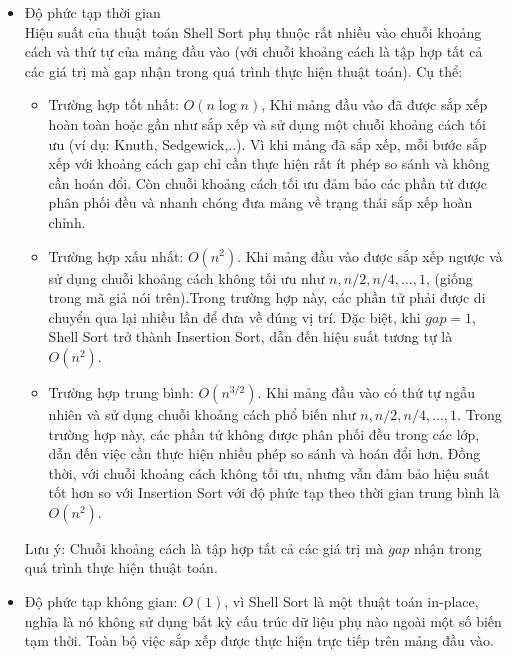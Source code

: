 \begin{itemize}
    \item Độ phức tạp thời gian\\
    Hiệu suất của thuật toán Shell Sort phụ thuộc rất nhiều vào chuỗi 
    khoảng cách và thứ tự của mảng đầu vào (với chuỗi khoảng cách là tập 
    hợp tất cả các giá trị mà gap nhận trong quá trình thực hiện thuật 
    toán). Cụ thể:
    \begin{itemize}[label=$\circ$]
	\item Trường hợp tốt nhất: $O\left(n\log{n}\right)$, Khi mảng đầu vào 
    đã được sắp xếp hoàn toàn hoặc gần như sắp xếp và sử dụng một chuỗi 
    khoảng cách tối ưu (ví dụ: Knuth, Sedgewick,..). Vì khi mảng đã sắp 
    xếp, mỗi bước sắp xếp với khoảng cách gap chỉ cần thực hiện rất ít 
    phép so sánh và không cần hoán đổi. Còn chuỗi khoảng cách tối ưu đảm 
    bảo các phần tử được phân phối đều và nhanh chóng đưa mảng về trạng 
    thái sắp xếp hoàn chỉnh.
	\item Trường hợp xấu nhất: $O\left(n^2\right)$. Khi mảng đầu vào được 
    sắp xếp ngược và sử dụng chuỗi khoảng cách không tối ưu như $n,n/2,n/4,
    \ldots,1$, (giống trong mã giả nói trên).Trong trường hợp này, các 
    phần tử phải được di chuyển qua lại nhiều lần để đưa về đúng vị trí. 
    Đặc biệt, khi $gap = 1$, Shell Sort trở thành Insertion Sort, dẫn đến 
    hiệu suất tương tự là $O\left(n^2\right)$.
    \item Trường hợp trung bình: $O\left(n^{3/2}\right)$. Khi mảng đầu vào 
    có thứ tự ngẫu nhiên và sử dụng chuỗi khoảng cách phổ biến như $n,n/2,
    n/4,\ldots,1$. Trong trường hợp này, các phần tử không được phân phối 
    đều trong các lớp, dẫn đến việc cần thực hiện nhiều phép so sánh và 
    hoán đổi hơn. Đồng thời, với chuỗi khoảng cách không tối ưu, nhưng vẫn 
    đảm bảo hiệu suất tốt hơn so với Insertion Sort với độ phức tạp theo 
    thời gian trung bình là $O\left(n^2\right)$.
    \end{itemize}
    Lưu ý: Chuỗi khoảng cách là tập hợp tất cả các giá trị mà $gap$ nhận 
    trong quá trình thực hiện thuật toán.
    
    \item Độ phức tạp không gian: $O\left(1\right)$, vì Shell Sort là một 
    thuật toán in-place, nghĩa là nó không sử dụng bất kỳ cấu trúc dữ liệu 
    phụ nào ngoài một số biến tạm thời. Toàn bộ việc sắp xếp được thực hiện 
    trực tiếp trên mảng đầu vào. 
\end{itemize}